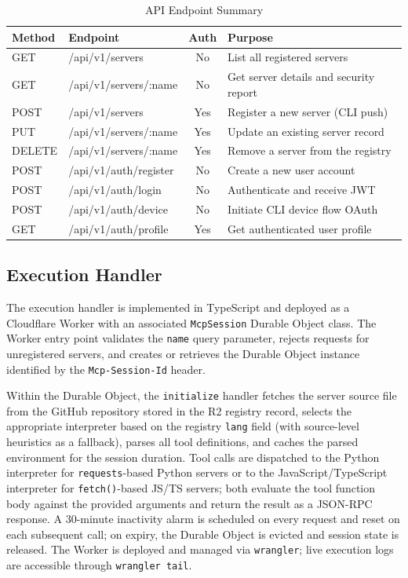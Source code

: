 \documentclass[conference]{IEEEtran}
\begin{document}
\begin{table}[htbp]
  \caption{API Endpoint Summary}
  \label{tab:api}
  \centering
  \begin{tabular}{llcp{3.5cm}}
    \toprule
    \textbf{Method} & \textbf{Endpoint} & \textbf{Auth} & \textbf{Purpose} \\
    \midrule
    GET    & /api/v1/servers          & No  & List all registered servers \\
    GET    & /api/v1/servers/:name    & No  & Get server details and security report \\
    POST   & /api/v1/servers          & Yes & Register a new server (CLI push) \\
    PUT    & /api/v1/servers/:name    & Yes & Update an existing server record \\
    DELETE & /api/v1/servers/:name    & Yes & Remove a server from the registry \\
    POST   & /api/v1/auth/register    & No  & Create a new user account \\
    POST   & /api/v1/auth/login       & No  & Authenticate and receive JWT \\
    POST   & /api/v1/auth/device      & No  & Initiate CLI device flow OAuth \\
    GET    & /api/v1/auth/profile     & Yes & Get authenticated user profile \\
    \bottomrule
  \end{tabular}
\end{table}

\subsection{Execution Handler}

The execution handler is implemented in TypeScript and deployed as a
Cloudflare Worker with an associated \texttt{McpSession} Durable Object
class.
The Worker entry point validates the \texttt{name} query parameter,
rejects requests for unregistered servers, and creates or retrieves the
Durable Object instance identified by the \texttt{Mcp-Session-Id}
header.

Within the Durable Object, the \texttt{initialize} handler fetches the
server source file from the GitHub repository stored in the R2 registry
record, selects the appropriate interpreter based on the registry
\texttt{lang} field (with source-level heuristics as a fallback),
parses all tool definitions, and caches the parsed environment for the
session duration.
Tool calls are dispatched to the Python interpreter for
\texttt{requests}-based Python servers or to the JavaScript/TypeScript
interpreter for \texttt{fetch()}-based JS/TS servers; both evaluate the
tool function body against the provided arguments and return the result
as a JSON-RPC response.
A 30-minute inactivity alarm is scheduled on every request and reset on
each subsequent call; on expiry, the Durable Object is evicted and
session state is released.
The Worker is deployed and managed via \texttt{wrangler}; live
execution logs are accessible through \texttt{wrangler tail}.
\end{document}
